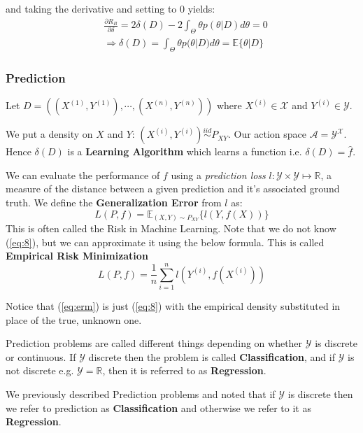 \documentclass[]{article}
\theoremstyle{mattstyle}
\theoremstyle{definition}
\begin{document}
and taking the derivative and setting to 0 yields:
\begin{align*}
&\frac{\partial R_B}{\partial \delta} = 2\delta(D) -2\int_{\Theta}^{}\theta p(\theta|D)d\theta = 0 \\
&\Rightarrow \delta(D) = \int_{\Theta}^{}\theta p(\theta|D)d\theta = \mathbb{E}\{\theta|D\}
\end{align*}

\newpage

\subsubsection{Prediction}
Let $D=((X^{(1)},Y^{(1)}), \cdots, (X^{(n)},Y^{(n)}))$ where $X^{(i)} \in \mathcal{X}$ and $Y^{(i)} \in \mathcal{Y}$. 

We put a density on $X$ and $Y$: $(X^{(i)},Y^{(i)}) \overset{iid}{\sim} P_{XY}$. Our action space $\mathcal{A} = \mathcal{Y}^\mathcal{X}$. Hence \(\delta(D)\) is a \textbf{Learning Algorithm} which learns a function i.e. $\delta(D) = \hat{f}$. 

We can evaluate the performance of $f$ using a \emph{prediction loss} $l: \mathcal{Y} \times \mathcal{Y} \mapsto \mathbb{R}$, a measure of the distance between a given prediction and it’s associated ground truth. We define the \textbf{Generalization Error} from $l$ as:
\begin{equation}\label{eq:8}
L(P,f) = \mathbb{E}_{(X,Y)\sim P_{XY}}\{l(Y,f(X)) \}
\end{equation}
This is often called the Risk in Machine Learning. Note that we do not know (\ref{eq:8}), but we can approximate it using the below formula. This is called \textbf{Empirical Risk Minimization}
\begin{equation}\label{eq:erm}
L(P,f) = \frac{1}{n}\sum_{i=1}^n l\left(Y^{(i)},f(X^{(i)})\right)
\end{equation}

Notice that (\ref{eq:erm}) is just (\ref{eq:8}) with the empirical density substituted in place of the true, unknown one.

Prediction problems are called different things depending on whether $\mathcal{Y}$ is discrete or continuous. If $\mathcal{Y}$ discrete then the problem is called \textbf{Classification}, and if $\mathcal{Y}$ is not discrete e.g. $\mathcal{Y} = \mathbb{R}$, then it is referred to as \textbf{Regression}.

We previously described Prediction problems and noted that if $\mathcal{Y}$ is discrete then we refer to prediction as \textbf{Classification} and otherwise we refer to it as \textbf{Regression}. 
\end{document}
